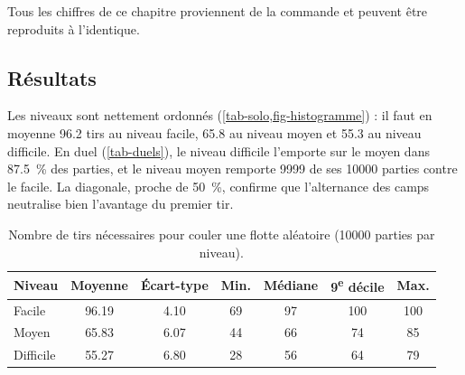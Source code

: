 Tous les chiffres de ce chapitre proviennent de la commande
 et peuvent être reproduits à
l'identique.

\subsection{Résultats}

Les niveaux sont nettement ordonnés (\cref{tab-solo,fig-histogramme}) : il faut en moyenne
\num{96.2} tirs au niveau facile, \num{65.8} au niveau moyen et \num{55.3} au niveau
difficile. En duel (\cref{tab-duels}), le niveau difficile l'emporte sur le moyen dans
\SI{87.5}{\percent} des parties, et le niveau moyen remporte \num{9999} de ses
\num{10000} parties contre le facile. La diagonale, proche de \SI{50}{\percent}, confirme
que l'alternance des camps neutralise bien l'avantage du premier tir.

\begin{table}[H]
    \centering
    \begin{tabular}{@{}l S[table-format=2.2] S[table-format=1.2] S[table-format=2.0]
            S[table-format=2.0] S[table-format=3.0] S[table-format=3.0]@{}}
        \toprule
        \textbf{Niveau}    & {\textbf{Moyenne}}                     & {\textbf{Écart-type}} & {\textbf{Min.}} &
        {\textbf{Médiane}} & {\textbf{9\textsuperscript{e} décile}} & {\textbf{Max.}}                                          \\
        \midrule
        Facile             & 96.19                                  & 4.10                  & 69              & 97 & 100 & 100 \\
        Moyen              & 65.83                                  & 6.07                  & 44              & 66 & 74  & 85  \\
        Difficile          & 55.27                                  & 6.80                  & 28              & 56 & 64  & 79  \\
        \bottomrule
    \end{tabular}
    \caption{Nombre de tirs nécessaires pour couler une flotte aléatoire
        (\num{10000} parties par niveau).}
    \label{tab-solo}
\end{table}


